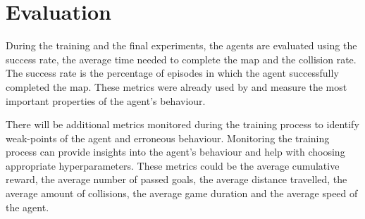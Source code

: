 \section{Evaluation}

During the training and the final experiments, the agents are evaluated using the success rate, the average time needed to complete the map and the collision rate. The success rate is the percentage of episodes in which the agent successfully completed the map. These metrics were already used by \autocite{maximilian} and measure the most important properties of the agent's behaviour.

There will be additional metrics monitored during the training process to identify weak-points of the agent and erroneous behaviour. Monitoring the training process can provide insights into the agent's behaviour and help with choosing appropriate hyperparameters.
These metrics could be the average cumulative reward, the average number of passed goals, the average distance travelled, the average amount of collisions, the average game duration and the average speed of the agent.


